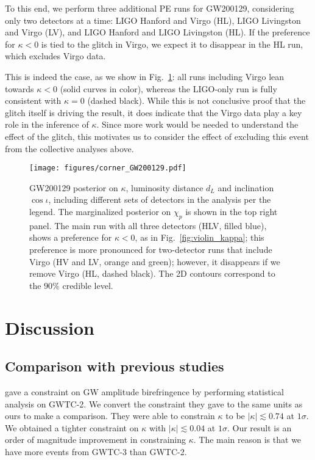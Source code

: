\documentclass[aps,prd,twocolumn,superscriptaddress,preprintnumbers,floatfix,nofootinbib]{revtex4-2}
\begin{document}
To this end, we perform three additional \ac{PE} runs for GW200129, considering only two detectors at a time: LIGO Hanford and Virgo (HL), LIGO Livingston and Virgo (LV), and LIGO Hanford and LIGO Livingston (HL).
If the preference for $\kappa < 0$ is tied to the glitch in Virgo, we expect it to disappear in the HL run, which excludes Virgo data.

This is indeed the case, as we show in Fig.~\ref{fig:corner_GW200129}: all runs including Virgo lean towards $\kappa < 0$ (solid curves in color), whereas the LIGO-only run is fully consistent with $\kappa = 0$ (dashed black).
While this is not conclusive proof that the glitch itself is driving the result, it does indicate that the Virgo data play a key role in the inference of $\kappa$.
Since more work would be needed to understand the effect of the glitch, this motivates us to consider the effect of excluding this event from the collective analyses above.

\begin{figure}
    \texttt{[image: figures/corner\_GW200129.pdf]}
    \caption{
        GW200129 posterior on $\kappa$, luminosity distance $d_L$ and inclination $\cos{\iota}$, including different sets of detectors in the analysis per the legend.
        The marginalized posterior on $\chi_p$ is shown in the top right panel.
        The main run with all three detectors (HLV, filled blue), shows a preference for $\kappa < 0$, as in Fig.~\ref{fig:violin_kappa}; this preference is more pronounced for two-detector runs that include Virgo (HV and LV, orange and green); however, it disappears if we remove Virgo (HL, dashed black).
        The 2D contours correspond to the $90\%$ credible level.
    }
    \label{fig:corner_GW200129}
\end{figure}

\section{Discussion}
\label{sec:Discussion}

\subsection{Comparison with previous studies}
\citet{Okounkova_2022} gave a constraint on GW amplitude birefringence by performing statistical analysis on GWTC-2.
We convert the constraint they gave to the same units as ours to make a comparison.
They were able to constrain $\kappa$ to be $|\kappa| \lesssim 0.74$ at $1 \sigma$.
We obtained a tighter constraint on $\kappa$ with $|\kappa| \lesssim 0.04$ at $1 \sigma$.
Our result is an order of magnitude improvement in constraining $\kappa$.
The main reason is that we have more events from GWTC-3 than GWTC-2.
\end{document}
